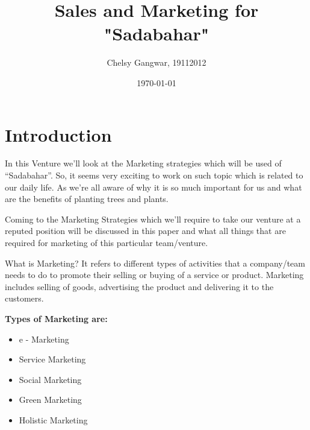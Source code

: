 \documentclass{article}
\title{\textbf{Sales and Marketing for "Sadabahar"}}
\author{Chelsy Gangwar, 19112012}
\date{\today}
\begin{document}
\maketitle

\section{Introduction}

\setlength{\parskip}{1em}

\large In this Venture we’ll look at the Marketing strategies which will be used of “Sadabahar”. So, it seems very exciting to work on such topic which is related to our daily life. As we’re all aware of why it is so much important for us and what are the benefits of planting trees and plants. 
\setlength{\parskip}{1em}

\large Coming to the Marketing Strategies which we’ll require to take our venture at a reputed position will be discussed in this paper and what all things that are required for marketing of this particular team/venture.
\setlength{\parskip}{1em}

\large What is Marketing?
\large It refers to different types of activities that a company/team needs to do to promote their selling or buying of a service or product. Marketing includes selling of goods, advertising the product and delivering it to the customers.
\setlength{\parskip}{1em}

\large{\textbf{Types of Marketing are: }}
\begin{itemize}
    \item e - Marketing
    \item Service Marketing
    \item Social Marketing
    \item Green Marketing
    \item Holistic Marketing
\end{itemize}
\end{document}
